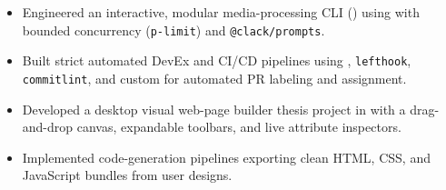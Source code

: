 

\begin{itemize}
    \item Engineered an interactive, modular media-processing CLI (\texttt{}) using  with bounded concurrency (\texttt{p-limit}) and \texttt{@clack/prompts}.
    \item Built strict automated DevEx and CI/CD pipelines using , \texttt{lefthook}, \texttt{commitlint}, and custom  for automated PR labeling and assignment.
\end{itemize}
\vspace{8.5pt}

\begin{itemize}
    \item Developed a desktop visual web-page builder thesis project in  with a drag-and-drop canvas, expandable toolbars, and live attribute inspectors.
    \item Implemented code-generation pipelines exporting clean HTML, CSS, and JavaScript bundles from user designs.
\end{itemize}
